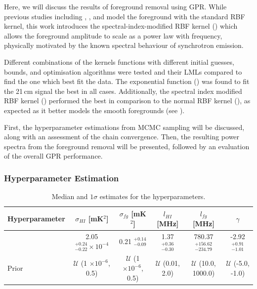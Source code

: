 Here, we will discuss the results of foreground removal using GPR. While previous studies including \cite{kernGaussianProcessForeground2020}, \cite{mertensImprovedUpperLimits2020}, and \cite{soaresGaussianProcessRegression2022} model the foreground with the standard RBF kernel, this work introduces the spectral-index-modified RBF kernel () which allows the foreground amplitude to scale as a power law with frequency, physically motivated by the known spectral behaviour of synchrotron emission.

Different combinations of the kernels functions with different initial guesses, bounds, and optimisation algorithms were tested and their LMLs compared to find the one which best fit the data. The exponential function () was found to fit the 21\,cm signal the best in all cases. Additionally, the spectral index modified RBF kernel () performed the best in comparison to the normal RBF kernel (), as expected as it better models the smooth foregrounds (see ). 

First, the hyperparameter estimations from MCMC sampling will be discussed, along with an assessment of the chain convergence. Then, the resulting power spectra from the foreground removal will be presented, followed by an evaluation of the overall GPR performance.

\subsubsection{Hyperparameter Estimation}

\begin{table}[bt!]
    \centering
    \renewcommand{\arraystretch}{2}
    \caption{Median and $1\sigma$ estimates for the hyperparameters.}
    \label{tab:hyperparameters}
    \begin{tabular}{|l|ccccc|}
        \hline
        Hyperparameter & $\sigma_{HI}$ [mK$^2$] & $\sigma_{fg}$ [mK$^2$] & $l_{HI}$ [MHz] & ${l_{fg}}$ [MHz] & $\gamma$ \\
        \hline
         & 2.05 $^{+0.24}_{-0.22}\times10^{-4}$ & 0.21 $^{+0.14}_{-0.09}$ & 1.37 $^{+0.36}_{-0.30}$ & 780.37 $^{+156.62}_{-234.79}$ & -2.92 $^{+0.91}_{-1.01}$ \\
         \hline
         \hline
        Prior & $\mathcal{U}$ (1 $\times 10^{-6}$, 0.5)& $\mathcal{U}$ (1$\times 10^{-6}$, 0.5) & $\mathcal{U}$ (0.01, 2.0) & $\mathcal{U}$ (10.0, 1000.0) & $\mathcal{U}$ (-5.0, -1.0) \\
        \hline
    \end{tabular}
\end{table}

